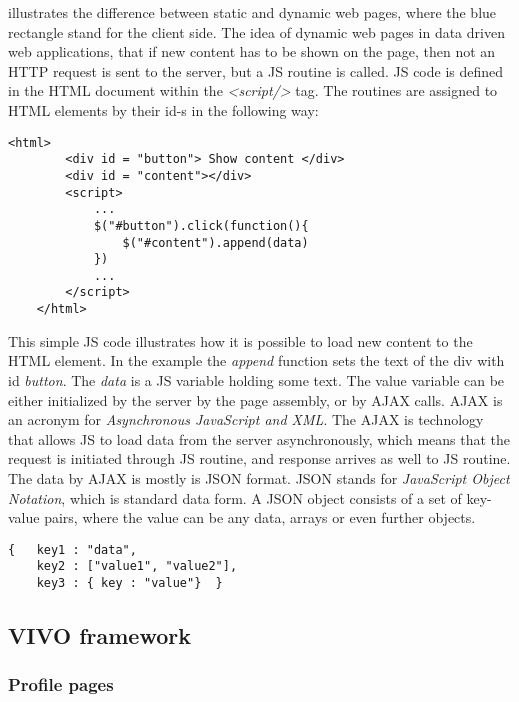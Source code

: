 
 illustrates the difference between static and dynamic web pages, where the blue rectangle stand for the client side. The idea of dynamic web pages in data driven web applications, that if new content has to be shown on the page, then not an HTTP request is sent to the server, but a JS routine is called. JS code is defined in the HTML document within the \textit{<script/>} tag. The routines are assigned to HTML elements by their id-s in the following way:

\begin{lstlisting}[captionpos=b, caption=JavaScript routine assigned to an HTML element, label=jsListing, belowskip=1em, aboveskip=2em,
basicstyle=\footnotesize,frame=single]
	<html>
		<div id = "button"> Show content </div>
		<div id = "content"></div>
		<script>
			...
			$("#button").click(function(){
				$("#content").append(data)
			})
			...	
		</script>
	</html>
\end{lstlisting}


This simple JS code illustrates how it is possible to load new content to the HTML element. In the example the \textit{append} function sets the text of the div with id \textit{button}. The \textit{data} is a JS variable holding
some text. The value variable can be either initialized by the server by the page assembly, or by AJAX calls. AJAX is an acronym for \textit{Asynchronous JavaScript and XML}. The AJAX is technology that allows JS to load data from the server asynchronously, which means that the request is initiated through JS routine, and response arrives as well to JS routine. The data by AJAX is mostly is JSON format. JSON stands for \textit{JavaScript Object Notation}, which is standard data form. A JSON object consists of a set of key-value pairs, where the value can be any data, arrays or even further objects.

\begin{lstlisting}[captionpos=b, caption=JSON object example, label=jsListing, belowskip=1em, aboveskip=2em,
basicstyle=\footnotesize,frame=single]
{	key1 : "data",
	key2 : ["value1", "value2"],
	key3 : { key : "value"}  }
\end{lstlisting}


\subsection{VIVO framework} \label{233}


\subsubsection{Profile pages} \label{233}



